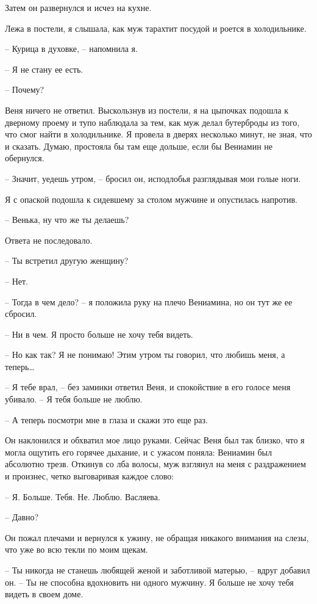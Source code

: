 \documentclass[
]{book}
\begin{document}
Затем он развернулся и исчез на кухне.

Лежа в постели, я слышала, как муж тарахтит посудой и роется в холодильнике.

-- Курица в духовке, -- напомнила я.

-- Я не стану ее есть.

-- Почему?

Веня ничего не ответил. Выскользнув из постели, я на цыпочках подошла к дверному проему и тупо наблюдала за тем, как муж делал бутерброды из того, что смог найти в холодильнике. Я провела в дверях несколько минут, не зная, что и сказать. Думаю, простояла бы там еще дольше, если бы Вениамин не обернулся.

-- Значит, уедешь утром, -- бросил он, исподлобья разглядывая мои голые ноги.

Я с опаской подошла к сидевшему за столом мужчине и опустилась напротив.

-- Венька, ну что же ты делаешь?

Ответа не последовало.

-- Ты встретил другую женщину?

-- Нет.

-- Тогда в чем дело? -- я положила руку на плечо Вениамина, но он тут же ее сбросил.

-- Ни в чем. Я просто больше не хочу тебя видеть.

-- Но как так? Я не понимаю! Этим утром ты говорил, что любишь меня, а теперь\ldots{}

-- Я тебе врал, -- без заминки ответил Веня, и спокойствие в его голосе меня убивало. -- Я тебя больше не люблю.

-- А теперь посмотри мне в глаза и скажи это еще раз.

Он наклонился и обхватил мое лицо руками. Сейчас Веня был так близко, что я могла ощутить его горячее дыхание, и с ужасом поняла: Вениамин был абсолютно трезв. Откинув со лба волосы, муж взглянул на меня с раздражением и произнес, четко выговаривая каждое слово:

-- Я. Больше. Тебя. Не. Люблю. Васляева.

-- Давно?

Он пожал плечами и вернулся к ужину, не обращая никакого внимания на слезы, что уже во всю текли по моим щекам.

-- Ты никогда не станешь любящей женой и заботливой матерью, -- вдруг добавил он. -- Ты не способна вдохновить ни одного мужчину. Я больше не хочу тебя видеть в своем доме.
\end{document}
